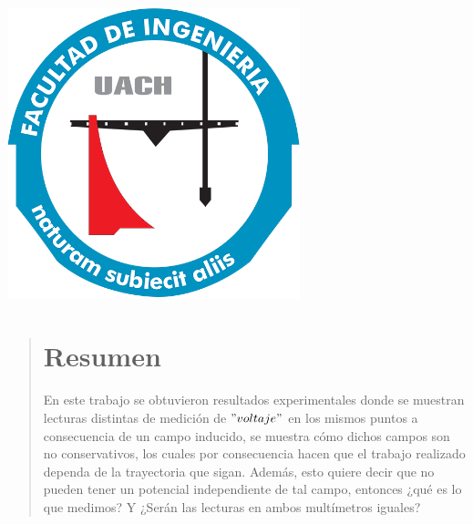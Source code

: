 \documentclass[a0,portrait]{a0poster}
\begin{document}
\begin{minipage}[ht]{0.15\linewidth}
    \includegraphics[width=8.5cm]{figures/logo ingenieria.png}\\
\end{minipage}




\begin{center}
    \begin{minipage}{0.7\textwidth}
        \begin{abstract}
       \centering \section*{Resumen}
       \large
            En este trabajo se obtuvieron resultados experimentales donde se muestran lecturas distintas de medición de $"voltaje"$ en los mismos puntos a consecuencia de un campo inducido, se muestra cómo dichos campos son no conservativos, los cuales por consecuencia hacen que el trabajo realizado dependa de la trayectoria que sigan. Además, esto quiere decir que no pueden tener un potencial independiente de tal campo, entonces ¿qué es lo que medimos? Y ¿Serán las lecturas en ambos multímetros iguales?
        \end{abstract}
    \end{minipage}
\end{center}
\end{document}
